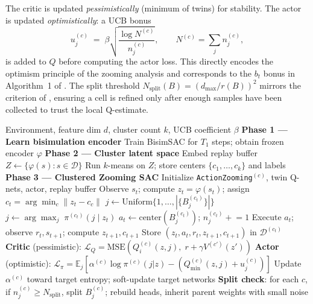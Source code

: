 \documentclass{article}
\begin{document}
The critic is updated \emph{pessimistically} (minimum of twins) for stability. The
actor is updated \emph{optimistically}: a UCB bonus
\[
  u_j^{(c)} \;=\; \beta\sqrt{\frac{\log N^{(c)}}{n_j^{(c)}}},
  \qquad N^{(c)} = \textstyle\sum_j n_j^{(c)},
\]
is added to $Q$ before computing the actor loss. This directly encodes the optimism
principle of the zooming analysis and corresponds to the $b_t$ bonus in Algorithm~1
of \citet{cao2021}. The split threshold $N_{\mathrm{split}}(B) = (d_{\max}/r(B))^2$
mirrors the criterion of \citet{cao2021}, ensuring a cell is refined only after
enough samples have been collected to trust the local Q-estimate.

\begin{algorithm}[H]
\caption{BisimZoom: Bisimulation-Guided Clustered Zooming SAC}
\begin{algorithmic}[1]
\Require Environment, feature dim $d$, cluster count $k$, UCB coefficient $\beta$
\vspace{0.4em}
\Statex \textbf{Phase 1 --- Learn bisimulation encoder}
\State Train BisimSAC for $T_1$ steps; obtain frozen encoder $\varphi$
\vspace{0.3em}
\Statex \textbf{Phase 2 --- Cluster latent space}
\State Embed replay buffer $Z \gets \{\varphi(s) : s \in \mathcal{D}\}$
\State Run $k$-means on $Z$; store centers $\{c_1,\ldots,c_k\}$ and labels
\vspace{0.3em}
\Statex \textbf{Phase 3 --- Clustered Zooming SAC}
  \State Initialize \texttt{ActionZooming}$^{(c)}$, twin Q-nets, actor, replay buffer
\EndFor
{}
  \State Observe $s_t$; compute $z_t = \varphi(s_t)$;
         assign $c_t = \arg\min_c \|z_t - c_c\|$
    \State $j \gets \mathrm{Uniform}\{1,\ldots,|\{B_j^{(c_t)}\}|\}$
  \Else
    \State $j \gets \arg\max_j\; \pi^{(c_t)}(j \mid z_t)$
  \EndIf
  \State $a_t \gets \mathrm{center}(B_j^{(c_t)})$;\quad
         $n_j^{(c_t)} \mathrel{+}= 1$
  \State Execute $a_t$; observe $r_t, s_{t+1}$; compute $z_{t+1}, c_{t+1}$
  \State Store $(z_t, a_t, r_t, z_{t+1}, c_{t+1})$ in $\mathcal{D}^{(c_t)}$
    \State \textbf{Critic} (pessimistic):
      $\mathcal{L}_Q = \mathrm{MSE}\!\left(Q_i^{(c)}(z,j),\;
        r + \gamma V^{(c')}(z')\right)$
    \State \textbf{Actor} (optimistic):
      $\mathcal{L}_\pi =
        \mathbb{E}_j\!\left[\alpha^{(c)} \log \pi^{(c)}(j|z)
          - \left(Q_{\min}^{(c)}(z,j) + u_j^{(c)}\right)\right]$
    \State Update $\alpha^{(c)}$ toward target entropy;\quad
           soft-update target networks
  \EndFor
  \State \textbf{Split check}: for each $c$, if $n_j^{(c)} \ge N_{\mathrm{split}}$,
         split $B_j^{(c)}$; rebuild heads, inherit parent weights with small noise
\EndFor
\end{algorithmic}
\end{algorithm}
\end{document}
